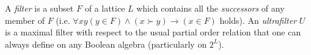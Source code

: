 A \emph{filter} is a subset $F$ of a lattice $L$ which contains all the \emph{successors} of any member of $F$ (i.e. $\forall xy(y\in F)\land(x\succ y)\rightarrow(x\in F)$ holds). An \emph{ultrafilter} $U$ is a maximal filter with respect to the usual partial order relation that one can always define on any Boolean algebra (particularly on $2^L$).
%
%
%
